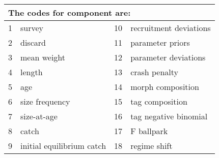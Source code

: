 \begin{center}
	\begin{longtable}{p{1cm} p{6cm} p{1cm} p{6cm} }
		\multicolumn{4}{l}{The codes for component are:}\\
		\hline
		1 & survey & 10 & recruitment deviations \\	
		2 & discard & 11 & parameter priors\\		
		3 &  mean weight & 12 & parameter deviations\\	
		4 & length & 13 & crash penalty\\		
		5 & age & 14 & morph composition\\
		6 & size frequency & 15 & tag composition\\		
		7 & size-at-age & 16 & tag negative binomial\\
		8 & catch & 17 & F ballpark\\		
		9 & initial equilibrium catch & 18 & regime shift  \\
		\hline
	\end{longtable}
\end{center}


\pagebreak
